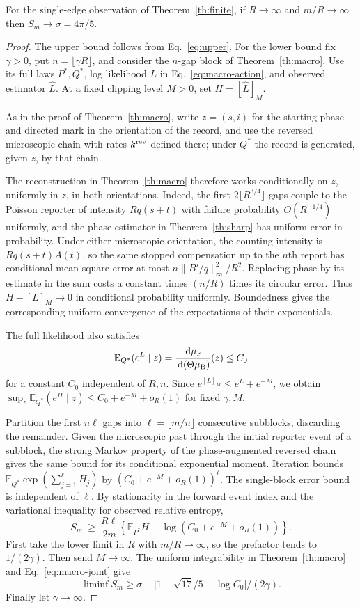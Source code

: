 \begin{corollary}\label{cor:longwindow}
For the single-edge observation of Theorem~\ref{th:finite}, if $R\to\infty$ and $m/R\to\infty$ then $S_m\to\sigma=4\pi/5$.
\end{corollary}
\begin{proof}
The upper bound follows from Eq.~\eqref{eq:upper}. For the lower bound fix $\gamma>0$, put $n=\lfloor\gamma R\rfloor$, and consider the $n$-gap block of Theorem~\ref{th:macro}. Use its full laws $P^*,Q^*$, log likelihood $L$ in Eq.~\eqref{eq:macro-action}, and observed estimator $\widehat L$. At a fixed clipping level $M>0$, set $H=[\widehat L]_M$.

As in the proof of Theorem~\ref{th:macro}, write $z=(s,i)$ for the starting phase and directed mark in the orientation of the record, and use the reversed microscopic chain with rates $k^{\rm rev}$ defined there; under $Q^*$ the record is generated, given $z$, by that chain.

The reconstruction in Theorem~\ref{th:macro} therefore works conditionally on $z$, uniformly in $z$, in both orientations. Indeed, the first $2\lfloor R^{3/4}\rfloor$ gaps couple to the Poisson reporter of intensity $Rq(s+t)$ with failure probability $O(R^{-1/4})$ uniformly, and the phase estimator in Theorem~\ref{th:sharp} has uniform error in probability. Under either microscopic orientation, the counting intensity is $Rq(s+t)A(t)$, so the same stopped compensation up to the $n$th report has conditional mean-square error at most $n\|B'/q\|_\infty^2/R^2$. Replacing phase by its estimate in the sum costs a constant times $(n/R)$ times its circular error. Thus $H-[L]_M\to0$ in conditional probability uniformly. Boundedness gives the corresponding uniform convergence of the expectations of their exponentials.

The full likelihood also satisfies
\[
 \mathbb E_{Q^*}(e^L\mid z)
   =\frac{\,\mathrm d\mu_\mathrm F}{\,\mathrm d(\Theta\mu_\mathrm B)}(z)\le C_0
\]
for a constant $C_0$ independent of $R,n$. Since $e^{[L]_M}\le e^L+e^{-M}$, we obtain $\sup_z\mathbb E_{Q^*}(e^H\mid z)\le C_0+e^{-M}+o_R(1)$ for fixed $\gamma,M$.

Partition the first $n\ell$ gaps into $\ell=\lfloor m/n\rfloor$ consecutive subblocks, discarding the remainder. Given the microscopic past through the initial reporter event of a subblock, the strong Markov property of the phase-augmented reversed chain gives the same bound for its conditional exponential moment. Iteration bounds $\mathbb E_{Q^*}\exp(\sum_{j=1}^\ell H_j)$ by $(C_0+e^{-M}+o_R(1))^\ell$. The single-block error bound is independent of $\ell$. By stationarity in the forward event index and the variational inequality for observed relative entropy,
\[
 S_m\ \ge\ \frac{R\ell}{2m}
  \left\{\mathbb E_{P^*}H-\log(C_0+e^{-M}+o_R(1))\right\}.
\]
First take the lower limit in $R$ with $m/R\to\infty$, so the prefactor tends to $1/(2\gamma)$. Then send $M\to\infty$. The uniform integrability in Theorem~\ref{th:macro} and Eq.~\eqref{eq:macro-joint} give
\[
 \liminf S_m\ge\sigma+
 \big[1-\sqrt{17}/5-\log C_0\big]/(2\gamma).
\]
Finally let $\gamma\to\infty$.
\end{proof}
